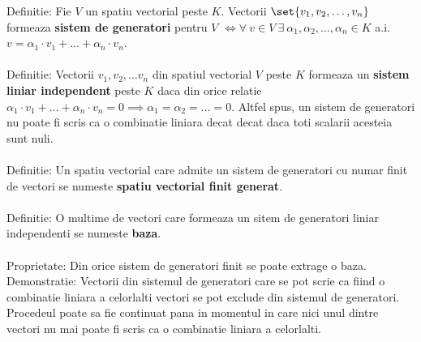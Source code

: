 \documentclass{article}
\begin{document}
        Definitie: Fie $V$ un spatiu vectorial peste $K$. Vectorii $\set{ v_{1}, v_2, \dots, v_{n}}$ formeaza \textbf{sistem de generatori} pentru $V$ $\iff
        \forall\ v \in V\ \exists\ \alpha_{1}, \alpha_{2}, \dots , \alpha_{n}\in K$ a.i. $v = \alpha_{1} \cdot v_{1} + \dots + \alpha_{n} \cdot v_{n}$. \\ \\
        Definitie: Vectorii $v_{1}, v_{2}, \dots v_{n}$ din spatiul vectorial $V$ peste $K$ formeaza un \textbf{sistem liniar independent} peste $K$ daca din orice relatie $\alpha_{1} \cdot v_{1} + \dots + \alpha_{n} \cdot v_{n} = 0 \implies \alpha_{1} = \alpha_{2} = \dots = 0$. Altfel spus, un sistem de generatori nu poate fi scris ca o combinatie liniara decat decat daca toti scalarii acesteia sunt nuli. \\ \\
        Definitie: Un spatiu vectorial care admite un sistem de generatori cu numar finit de vectori se numeste \textbf{spatiu vectorial finit generat}. \\ \\
        Definitie: O multime de vectori care formeaza un sitem de generatori liniar independenti se numeste \textbf{baza}. \\ \\
        Proprietate: Din orice sistem de generatori finit se poate extrage o baza.\\
        Demonstratie: Vectorii din sistemul de generatori care se pot scrie ca fiind o combinatie liniara a celorlalti vectori se pot exclude din sistemul de generatori. Procedeul poate sa fie continuat pana in momentul in care nici unul dintre vectori nu mai poate fi scris ca o combinatie liniara a celorlalti.
\end{document}
